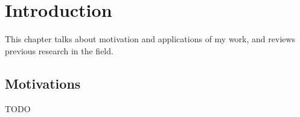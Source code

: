 \chapter{Introduction}
\label{cha:introduction}

This chapter talks about motivation and applications of my work,
and reviews previous research in the field.

\section{Motivations}
\label{sec:motivations}

TODO
